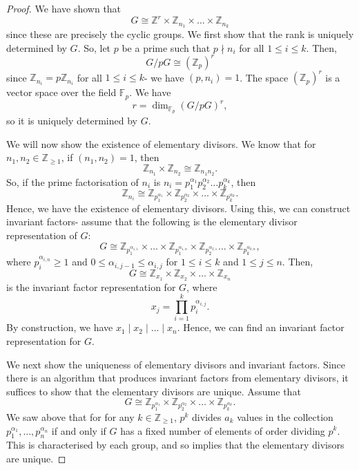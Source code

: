 \documentclass[a4paper, openany]{memoir}
\theoremstyle{definition}
\theoremstyle{plain}
\begin{document}
    \begin{proof}
        We have shown that
        \[G \cong \mathbb{Z}^r \times \mathbb{Z}_{n_1} \times \dots \times \mathbb{Z}_{n_k}\]
        since these are precisely the cyclic groups. We first show that the rank is uniquely determined by $G$. So, let $p$ be a prime such that $p \nmid n_i$ for all $1 \leq i \leq k$. Then, 
        \[G/pG \cong (\mathbb{Z}_p)^r\]
        since $\mathbb{Z}_{n_i} = p\mathbb{Z}_{n_i}$ for all $1 \leq i \leq k$- we have $(p, n_i) = 1$. The space $(\mathbb{Z}_p)^r$ is a vector space over the field $\mathbb{F}_p$. We have
        \[r = \dim_{\mathbb{F}_p} (G/pG)^r,\]
        so it is uniquely determined by $G$.
        
        We will now show the existence of elementary divisors. We know that for $n_1, n_2 \in \mathbb{Z}_{\geq 1}$, if $(n_1, n_2) = 1$, then
        \[\mathbb{Z}_{n_1} \times \mathbb{Z}_{n_2} \cong \mathbb{Z}_{n_1 n_2}.\]
        So, if the prime factorisation of $n_i$ is $n_i = p_1^{\alpha_1} p_2^{\alpha_2} \dots p_k^{\alpha_k}$, then
        \[\mathbb{Z}_{n_i} \cong \mathbb{Z}_{p_1^{\alpha_1}} \times \mathbb{Z}_{p_2^{\alpha_2}} \times \dots \times \mathbb{Z}_{p_k^{\alpha_k}}.\]
        Hence, we have the existence of elementary divisors. Using this, we can construct invariant factors- assume that the following is the elementary divisor representation of $G$:
        \[G \cong \mathbb{Z}_{p_1^{\alpha_{1, 1}}} \times \dots \times \mathbb{Z}_{p_1^{\alpha_{1, n}}} \times \mathbb{Z}_{p_2^{\alpha_{2, 1}}} \dots \times \mathbb{Z}_{p_k^{\alpha_{k, n}}},\]
        where $p_i^{\alpha_{i, n}} \geq 1$ and $0 \leq \alpha_{i, j-1} \leq \alpha_{i, j}$ for $1 \leq i \leq k$ and $1 \leq j \leq n$. Then,
        \[G \cong \mathbb{Z}_{x_1} \times \mathbb{Z}_{x_2} \times \dots \times \mathbb{Z}_{x_n}\]
        is the invariant factor representation for $G$, where
        \[x_j = \prod_{i=1}^k p_i^{\alpha_{i, j}}.\]
        By construction, we have $x_1 \mid x_2 \mid \dots \mid x_n$. Hence, we can find an invariant factor representation for $G$.

        We next show the uniqueness of elementary divisors and invariant factors. Since there is an algorithm that produces invariant factors from elementary divisors, it suffices to show that the elementary divisors are unique. Assume that 
        \[G \cong \mathbb{Z}_{p_1^{\alpha_1}} \times \mathbb{Z}_{p_2^{\alpha_2}} \times \dots \times \mathbb{Z}_{p_k^{\alpha_k}}.\]
        We saw above that for for any $k \in \mathbb{Z}_{\geq 1}$, $p^k$ divides $a_k$ values in the collection $p_1^{\alpha_1}, \dots, p_n^{\alpha_n}$ if and only if $G$ has a fixed number of elements of order dividing $p^k$. This is characterised by each group, and so implies that the elementary divisors are unique.
    \end{proof}
\end{document}
